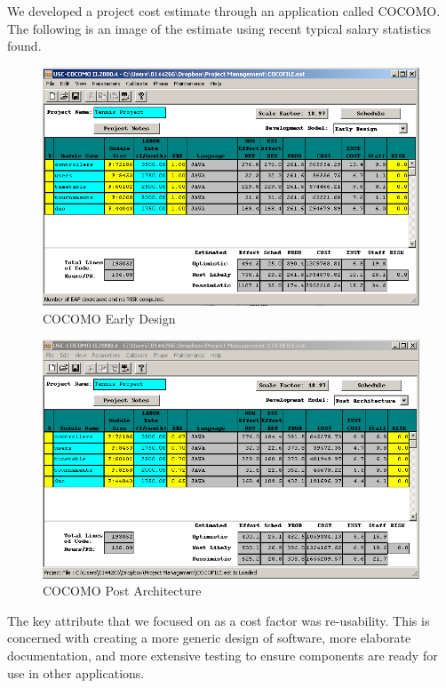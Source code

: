 We developed a project cost estimate through an application called COCOMO. The following is an image of the estimate using recent typical salary statistics 
found.

\begin{figure}[H]
\begin{center}
\includegraphics[width=14cm]{cocopre.png}
\end{center}
\caption{COCOMO Early Design}
\label{fig:letter}
\end{figure}

\begin{figure}[H]
\begin{center}
\includegraphics[width=14cm]{cocopost.png}
\end{center}
\caption{COCOMO Post Architecture }
\label{fig:letter}
\end{figure}

The key attribute that we focused on as a cost factor was re-usability. This is concerned with creating a more generic design of software, more elaborate documentation, and more extensive testing to ensure components are ready for use in other applications.


